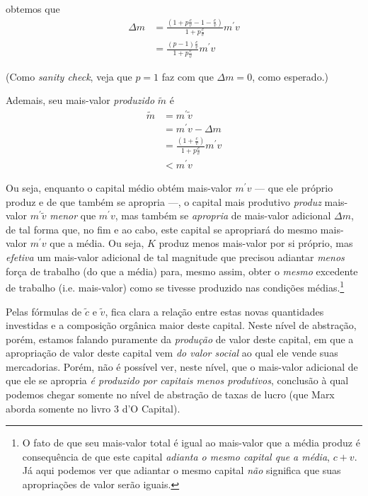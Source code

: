 obtemos que
\begin{align*}
\Delta m &=\frac{\left( 1 + p \frac{c}{v} - 1 - \frac{c}{v} \right)}{1+p \frac{c}{v}} m^{\prime}v \\
&= \frac{(p-1) \frac{c}{v}}{1+ p \frac{c}{v}} m^{\prime}v
\end{align*}

(Como \textit{sanity check}, veja que $p=1$ faz com que $\Delta m=0$, como esperado.)

Ademais, seu mais-valor \textit{produzido} $\tilde{m}$ é 
\begin{align*}
\tilde{m} &= m^{\prime}\tilde{v}  \\
&= m^{\prime}v - \Delta m \\
&= \frac{\left( 1+\frac{c}{v} \right)}{1 + p \frac{c}{v}} m^{\prime} v  \\
&< m^{\prime}v
\end{align*}

Ou seja, enquanto o capital médio obtém mais-valor $m^{\prime}v$ — que ele próprio produz e de que também se apropria —, o capital mais produtivo \textit{produz} mais-valor $m^{\prime} \tilde{v}$ \textit{menor} que $m^{\prime}v$, mas também se \textit{apropria} de mais-valor adicional $\Delta m$, de tal forma que, no fim e ao cabo, este capital se apropriará do mesmo mais-valor $m^{\prime}v$ que a média. Ou seja, $K$ produz menos mais-valor por si próprio, mas \textit{efetiva} um mais-valor adicional de tal magnitude que precisou adiantar \textit{menos} força de trabalho (do que a média) para, mesmo assim, obter o \textit{mesmo} excedente de trabalho (i.e. mais-valor) como se tivesse produzido nas condições médias.\footnote{O fato de que seu mais-valor total é igual ao mais-valor que a média produz é consequência de que este capital \textit{adianta o mesmo capital que a média}, $c+v$. Já aqui podemos ver que adiantar o mesmo capital \textit{não} significa que suas apropriações de valor serão iguais.}

Pelas fórmulas de $\tilde{c}$ e $\tilde{v}$, fica clara a relação entre estas novas quantidades investidas e a composição orgânica maior deste capital. Neste nível de abstração, porém, estamos falando puramente da \textit{produção} de valor deste capital, em que a apropriação de valor deste capital vem \textit{do valor social} ao qual ele vende suas mercadorias. Porém, não é possível ver, neste nível, que o mais-valor adicional de que ele se apropria \textit{é produzido por capitais menos produtivos}, conclusão à qual podemos chegar somente no nível de abstração de taxas de lucro (que Marx aborda somente no livro 3 d'O Capital). 


